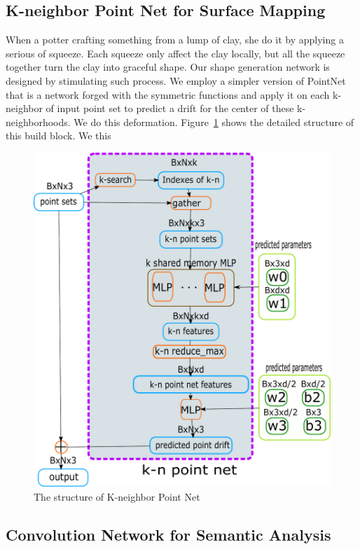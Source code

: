 \subsection{K-neighbor Point Net for Surface Mapping}
When a potter crafting something from a lump of clay, she do it by applying a serious of squeeze. Each squeeze only affect the clay locally, but all the squeeze together turn the clay into graceful shape. Our shape generation network is designed by stimulating such process. We employ a simpler version of PointNet\cite{PointNet} that is a network forged with the symmetric functions and apply it on each k-neighbor of input point set to predict a drift for the center of these k-neighborhoods. We do this deformation. Figure~\ref{fig:knpointnet} shows the detailed structure of this build block. 
We this 
\begin{figure}[htbp]
	\centering
	\includegraphics[width=\linewidth]{img/net/k-n_pointnet}
	\caption{The structure of K-neighbor Point Net}
	\label{fig:knpointnet}
\end{figure}

\subsection{Convolution Network for Semantic Analysis}


